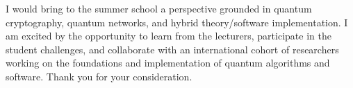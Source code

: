 I would bring to the summer school a perspective grounded in quantum cryptography, quantum networks, and hybrid theory/software implementation. I am excited by the opportunity to learn from the lecturers, participate in the student challenges, and collaborate with an international cohort of researchers working on the foundations and implementation of quantum algorithms and software. Thank you for your consideration.

